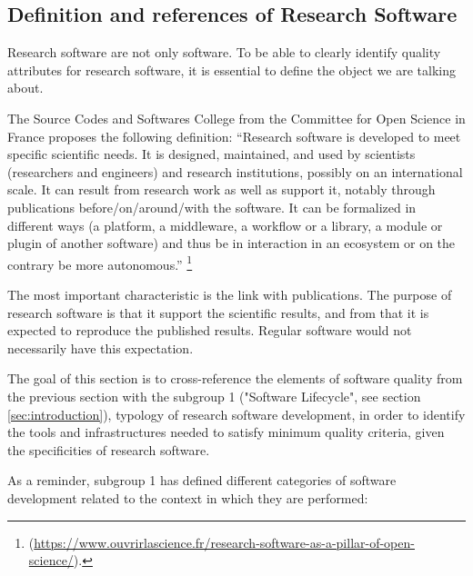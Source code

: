 \subsection{Definition and references of Research Software}
\label{subsec:defrs}

Research software are not only software. To be able to clearly
identify quality attributes for research software, it is essential to
define the object we are talking about.

The Source Codes and Softwares College from the Committee for Open
Science in France proposes the following definition: 
``Research software is developed to meet specific scientific needs. It
is designed, maintained, and used by scientists (researchers and
engineers) and research institutions, possibly on an international
scale. It can result from research work as well as support it, notably
through publications before/on/around/with the software. It can be
formalized in different ways (a platform, a middleware, a workflow or
a library, a module or plugin of another software) and thus be in
interaction in an ecosystem or on the contrary be more
autonomous.'' \footnote{(\url{https://www.ouvrirlascience.fr/research-software-as-a-pillar-of-open-science/}).}

The most important characteristic is the link with publications. The
purpose of research software is that it support the scientific
results, and from that it is expected to reproduce the published
results. Regular software would not necessarily have this expectation.

The goal of this section is to cross-reference the elements of
software quality from the previous section with the subgroup 1
\cite{sg1tf2023} ("Software Lifecycle", see section
\ref{sec:introduction}), typology of research software development, in
order to identify the tools and infrastructures needed to satisfy
minimum quality criteria, given the specificities of research software.  

As a reminder, subgroup 1 has defined different categories of software
development related to the context in which they are performed:

